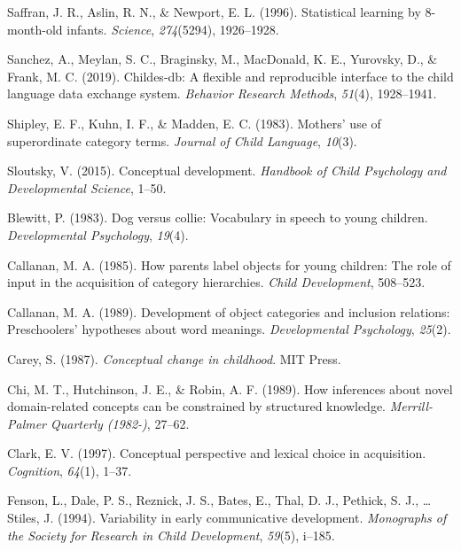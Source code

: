 \documentclass[english,,man,floatsintext]{apa6}
\begin{document}
\leavevmode\hypertarget{ref-saffran1996}{}%
Saffran, J. R., Aslin, R. N., \& Newport, E. L. (1996). Statistical learning by 8-month-old infants. \emph{Science}, \emph{274}(5294), 1926--1928.

\leavevmode\hypertarget{ref-sanchez2019}{}%
Sanchez, A., Meylan, S. C., Braginsky, M., MacDonald, K. E., Yurovsky, D., \& Frank, M. C. (2019). Childes-db: A flexible and reproducible interface to the child language data exchange system. \emph{Behavior Research Methods}, \emph{51}(4), 1928--1941.

\leavevmode\hypertarget{ref-shipley1983}{}%
Shipley, E. F., Kuhn, I. F., \& Madden, E. C. (1983). Mothers' use of superordinate category terms. \emph{Journal of Child Language}, \emph{10}(3).

\leavevmode\hypertarget{ref-sloutsky2015}{}%
Sloutsky, V. (2015). Conceptual development. \emph{Handbook of Child Psychology and Developmental Science}, 1--50.

\leavevmode\hypertarget{ref-blewitt1983}{}%
Blewitt, P. (1983). Dog versus collie: Vocabulary in speech to young children. \emph{Developmental Psychology}, \emph{19}(4).

\leavevmode\hypertarget{ref-callanan1985}{}%
Callanan, M. A. (1985). How parents label objects for young children: The role of input in the acquisition of category hierarchies. \emph{Child Development}, 508--523.

\leavevmode\hypertarget{ref-callanan1989}{}%
Callanan, M. A. (1989). Development of object categories and inclusion relations: Preschoolers' hypotheses about word meanings. \emph{Developmental Psychology}, \emph{25}(2).

\leavevmode\hypertarget{ref-carey1987}{}%
Carey, S. (1987). \emph{Conceptual change in childhood}. MIT Press.

\leavevmode\hypertarget{ref-chi1989}{}%
Chi, M. T., Hutchinson, J. E., \& Robin, A. F. (1989). How inferences about novel domain-related concepts can be constrained by structured knowledge. \emph{Merrill-Palmer Quarterly (1982-)}, 27--62.

\leavevmode\hypertarget{ref-clark1997}{}%
Clark, E. V. (1997). Conceptual perspective and lexical choice in acquisition. \emph{Cognition}, \emph{64}(1), 1--37.

\leavevmode\hypertarget{ref-fenson94}{}%
Fenson, L., Dale, P. S., Reznick, J. S., Bates, E., Thal, D. J., Pethick, S. J., \ldots{} Stiles, J. (1994). Variability in early communicative development. \emph{Monographs of the Society for Research in Child Development}, \emph{59}(5), i--185.
\end{document}

